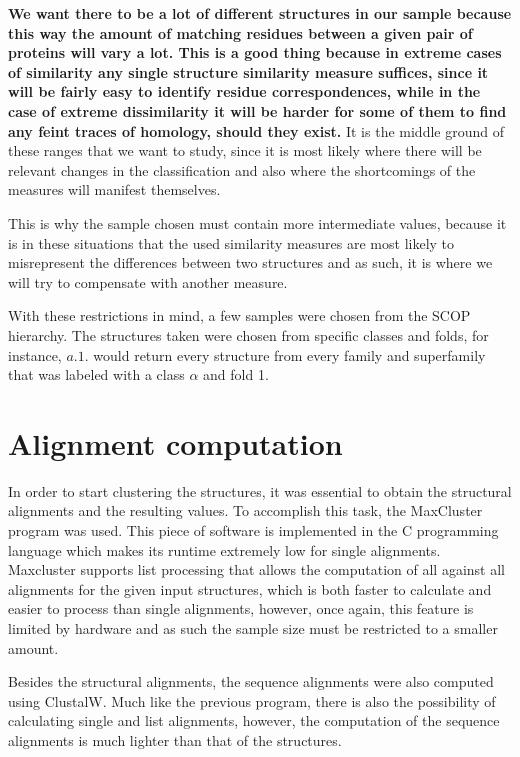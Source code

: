\textbf{We want there to be a lot of different structures in our sample because this way the amount of matching residues between a given pair of proteins will vary a lot. This is a good thing because in extreme cases of similarity any single structure similarity measure suffices, since it will be fairly easy to identify residue correspondences, while in the case of extreme dissimilarity it will be harder for some of them to find any feint traces of homology, should they exist.} It is the middle ground of these ranges that we want to study, since it is most likely where there will be relevant changes in the classification and also where the shortcomings of the measures will manifest themselves.

This is why the sample chosen must contain more intermediate values, because it is in these situations that the used similarity measures are most likely to misrepresent the differences between two structures and as such, it is where we will try to compensate with another measure.

With these restrictions in mind, a few samples were chosen from the SCOP hierarchy. The structures taken were chosen from specific classes and folds, for instance, $a.1.$ would return every structure from every family and superfamily that was labeled with a class $\alpha$ and fold 1. 

\chapter{Alignment computation}

In order to start clustering the structures, it was essential to obtain the structural alignments and the resulting values. To accomplish this task, the MaxCluster program was used. This piece of software is implemented in the C programming language which makes its runtime extremely low for single alignments. Maxcluster supports list processing that allows the computation of all against all alignments for the given input structures, which is both faster to calculate and easier to process than single alignments, however, once again, this feature is limited by hardware and as such the sample size must be restricted to a smaller amount.

Besides the structural alignments, the sequence alignments were also computed using ClustalW. Much like the previous program, there is also the possibility of calculating single and list alignments, however, the computation of the sequence alignments is much lighter than that of the structures.

